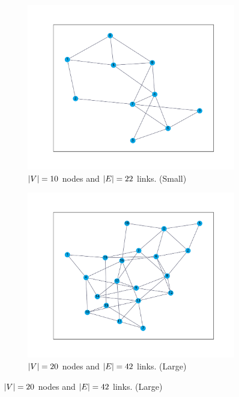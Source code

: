 \begin{figure}[!htbp]
	\centering
	\begin{subfigure}{0.4\textwidth}
	\includegraphics[width=\textwidth]{pictures/plots/10.pdf}
	\caption{\scriptsize$\lvert V\rvert = 10$ nodes and $\lvert E\rvert = 22$ links. (Small)}
	\end{subfigure}
	\quad
	\begin{subfigure}{0.4\textwidth}
	\includegraphics[width=\textwidth]{pictures/plots/20.pdf}
	\caption{\scriptsize$\lvert V\rvert = 20$ nodes and $\lvert E\rvert = 42$ links. (Large)}
	\end{subfigure}
	\label{fig:toynetworks}
\end{figure}
%
